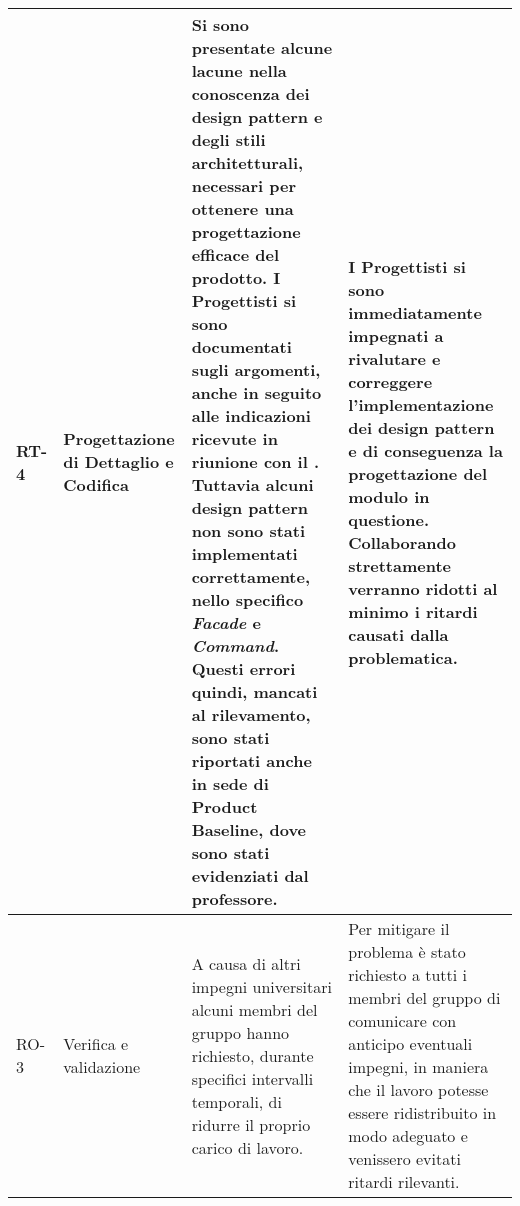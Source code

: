 \begin{appendices}
\begin{longtable}{
		>{\centering}p{}
		>{\centering}p{}
		>{\centering\arraybackslash}p{}
		>{\centering\arraybackslash}p{} }
		RT-4
		&
		Progettazione di Dettaglio e Codifica
		&
		Si sono presentate alcune lacune nella conoscenza dei design pattern\ped{\textit{G}} e degli stili architetturali, necessari per ottenere una progettazione efficace del prodotto\ped{\textit{G}}. I Progettisti si sono documentati sugli argomenti, anche in seguito alle indicazioni ricevute in riunione con il \RC{}. Tuttavia alcuni design pattern\ped{\textit{G}} non sono stati implementati correttamente, nello specifico \textit{Facade} e \textit{Command}. Questi errori quindi, mancati al rilevamento, sono stati riportati anche in sede di Product Baseline\ped{\textit{G}}, dove sono stati evidenziati dal professore.
		&
		I Progettisti si sono immediatamente impegnati a rivalutare e correggere l'implementazione dei design pattern\ped{\textit{G}} e di conseguenza la progettazione del modulo\ped{\textit{G}} in questione. Collaborando strettamente verranno ridotti al minimo i ritardi causati dalla problematica.\\
\hline
		RO-3
		&
		Verifica e validazione
		&
		A causa di altri impegni universitari alcuni membri del gruppo hanno richiesto, durante specifici intervalli temporali, di ridurre il proprio carico di lavoro. 
		&
		Per mitigare il problema è stato richiesto a tutti i membri del gruppo di comunicare con anticipo eventuali impegni, in maniera che il lavoro potesse essere ridistribuito in modo adeguato e venissero evitati ritardi rilevanti. \\
	\end{longtable}
\end{appendices}
